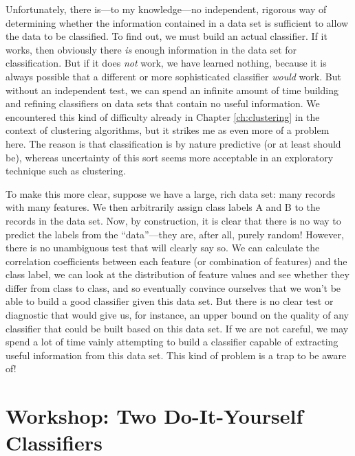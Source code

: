 Unfortunately, there is---to my knowledge---no independent, rigorous
way of determining whether the information contained in a data set is
sufficient to allow the data to be classified. To find out, we must
build an actual classifier. If it works, then obviously there
\emph{is} enough information in the data set for classification. But
if it does \emph{not} work, we have learned nothing, because it is
always possible that a different or more sophisticated classifier
\emph{would} work. But without an independent test, we can spend an
infinite amount of time building and refining classifiers on data sets
that contain no useful information. We encountered this kind of
difficulty already in Chapter \ref{ch:clustering} in the context of
clustering algorithms, but it strikes me as even more of a problem
here. The reason is that classification is by nature predictive (or at
least should be), whereas uncertainty of this sort seems more
acceptable in an exploratory technique such as clustering.

To make this more clear, suppose we have a large, rich data set: many
records with many features. We then arbitrarily assign class labels A
and B to the records in the data set.  Now, by construction, it is
clear that\vadjust{\pagebreak} there is no way to predict the labels from the
``data''---they are, after all, purely random! However, there is no
unambiguous  test that will clearly say so. We can calculate the
correlation coefficients between  each feature (or combination of
features) and the class label, we can look at the distribution of
feature values and see whether they differ from class to class, and so
eventually convince ourselves that we won't be able to build a good
classifier given this data set. But there is no clear test or
diagnostic that would give us, for instance, an upper bound on the
quality of any classifier that could be built based on this data set.
If we are not careful, we may spend a lot of time vainly attempting to
build a classifier capable of extracting useful information from this
data set. This kind of problem is a trap to be aware of!



\spreadlong{-13pt}

\section{Workshop: Two Do-It-Yourself Classifiers}

